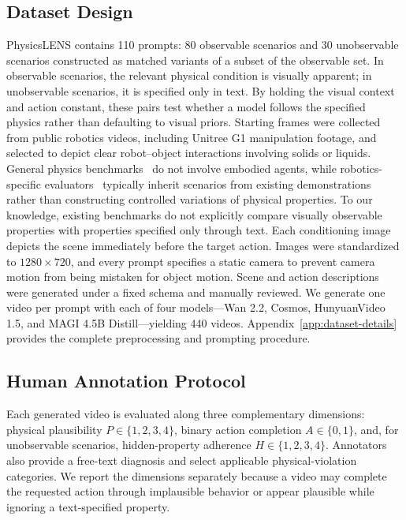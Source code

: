 \documentclass{article} %
\begin{document}
\subsection{Dataset Design}
PhysicsLENS contains 110 prompts: 80 observable scenarios and 30 unobservable scenarios constructed as matched variants of a subset of the observable set. In observable scenarios, the relevant physical condition is visually apparent; in unobservable scenarios, it is specified only in text. By holding the visual context and action constant, these pairs test whether a model follows the specified physics rather than defaulting to visual priors.
Starting frames were collected from public robotics videos, including Unitree G1 manipulation footage, and selected to depict clear robot--object interactions involving solids or liquids. General physics benchmarks~\citep{tung2023physionevaluatingphysicalscene,motamed2026physicsiq,meng2024phygenbench} do not involve embodied agents, while robotics-specific evaluators~\citep{nguyen2026robogaze,RBench_deng2026rethinkingvideogenerationmodel} typically inherit scenarios from existing demonstrations rather than constructing controlled variations of physical properties. To our knowledge, existing benchmarks do not explicitly compare visually observable properties with properties specified only through text.
Each conditioning image depicts the scene immediately before the target action. Images were standardized to $1280\times720$, and every prompt specifies a static camera to prevent camera motion from being mistaken for object motion. Scene and action descriptions were generated under a fixed schema and manually reviewed. We generate one video per prompt with each of four models---Wan 2.2, Cosmos, HunyuanVideo 1.5, and MAGI 4.5B Distill---yielding 440 videos. Appendix~\ref{app:dataset-details} provides the complete preprocessing and prompting procedure.

\subsection{Human Annotation Protocol}
\label{sec:human-annotation}
Each generated video is evaluated along three complementary dimensions: physical plausibility $P\in\{1,2,3,4\}$, binary action completion $A\in\{0,1\}$, and, for unobservable scenarios, hidden-property adherence $H\in\{1,2,3,4\}$. Annotators also provide a free-text diagnosis and select applicable physical-violation categories. We report the dimensions separately because a video may complete the requested action through implausible behavior or appear plausible while ignoring a text-specified property.
\end{document}
